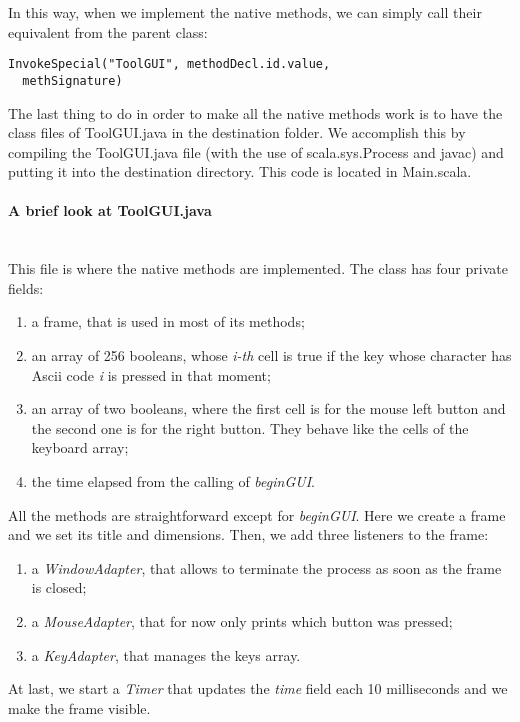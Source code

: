 \begin{itemize}
In this way, when we implement the native methods, we can simply call their equivalent from the parent class:
\begin{lstlisting}
InvokeSpecial("ToolGUI", methodDecl.id.value,
  methSignature)
\end{lstlisting}
The last thing to do in order to make all the native methods work is to have the class files of ToolGUI.java in the destination folder.
We accomplish this by compiling the ToolGUI.java file (with the use of scala.sys.Process and javac) and putting it into the destination directory.
This code is located in Main.scala.
\end{itemize}
\paragraph{A brief look at ToolGUI.java} \hfill \\
This file is where the native methods are implemented.
The class has four private fields:
\begin{enumerate}
\item{}
a frame, that is used in most of its methods;
\item{}
an array of 256 booleans, whose \textit{i-th} cell is true if the key whose character has Ascii code \textit{i} is pressed in that moment;
\item{}
an array of two booleans, where the first cell is for the mouse left button and the second one is for the right button. They behave like the cells of the keyboard array;
\item{}
the time elapsed from the calling of \textit{beginGUI}.
\end{enumerate}
All the methods are straightforward except for \textit{beginGUI}.
Here we create a frame and we set its title and dimensions.
Then, we add three listeners to the frame:
\begin{enumerate}
\item{}
a \textit{WindowAdapter}, that allows to terminate the process as soon as the frame is closed;
\item{}
a \textit{MouseAdapter}, that for now only prints which button was pressed;
\item{}
a \textit{KeyAdapter}, that manages the keys array.
\end{enumerate}
At last, we start a \textit{Timer} that updates the \textit{time} field each 10 milliseconds and we make the frame visible.
